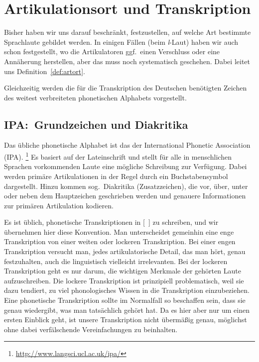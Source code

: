 \section{Artikulationsort und Transkription}

\label{sec:artort}

Bisher haben wir uns darauf beschränkt, festzustellen, auf welche Art bestimmte Sprachlaute gebildet werden.
In einigen Fällen (\zB beim \textit{l}-Laut) haben wir auch schon festgestellt, wo die Artikulatoren ggf.\ einen Verschluss oder eine Annäherung herstellen, aber das muss noch systematisch geschehen.
Dabei leitet uns Definition~\ref{def:artort}.


Gleichzeitig werden die für die Transkription des Deutschen benötigten Zeichen des weitest verbreiteten phonetischen Alphabets vorgestellt.

\subsection{IPA:\ Grundzeichen und Diakritika}


Das übliche phonetische Alphabet ist das der International Phonetic Association (IPA).%
\footnote{\url{http://www.langsci.ucl.ac.uk/ipa/}}
Es basiert auf der Lateinschrift und stellt für alle in menschlichen Sprachen vorkommenden Laute eine mögliche Schreibung zur Verfügung.
Dabei werden primäre Artikulationen in der Regel durch ein Buchstabensymbol dargestellt.
Hinzu kommen sog.\ Diakritika (Zusatzzeichen), die vor, über, unter oder neben dem Hauptzeichen geschrieben werden und genauere Informationen zur primären Artikulation kodieren.

Es ist üblich, phonetische Transkriptionen in [~] zu schreiben, und wir übernehmen hier diese Konvention.
Man unterscheidet gemeinhin eine enge Transkription von einer weiten oder lockeren Transkription.
Bei einer engen Transkription versucht man, jedes artikulatorische Detail, das man hört, genau festzuhalten, auch die linguistisch vielleicht irrelevanten.
Bei der lockeren Transkription geht es nur darum, die wichtigen Merkmale der gehörten Laute aufzuschreiben.
Die lockere Transkription ist prinzipiell problematisch, weil sie dazu tendiert, zu viel phonologisches Wissen in die Transkription einzubeziehen.
Eine phonetische Transkription sollte im Normalfall so beschaffen sein, dass sie genau wiedergibt, was man tatsächlich gehört hat.
Da es hier aber nur um einen ersten Einblick geht, ist unsere Transkription nicht übermäßig genau, möglichst ohne dabei verfälschende Vereinfachungen zu beinhalten.

